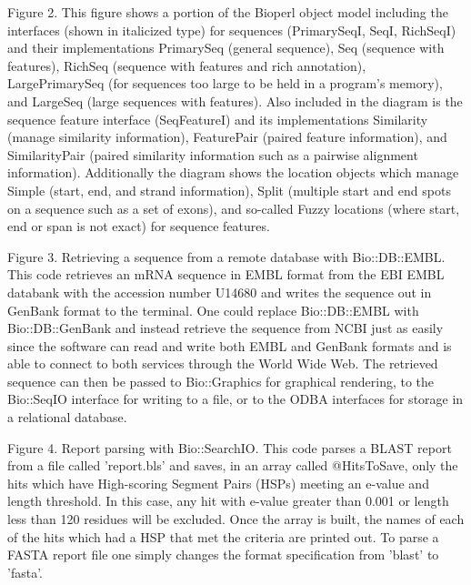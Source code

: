 \documentclass[12pt]{article}
\begin{document}
\newpage


Figure 2. This figure shows a portion of the Bioperl object model
including the interfaces (shown in italicized type) for sequences
(PrimarySeqI, SeqI, RichSeqI) and their implementations PrimarySeq
(general sequence), Seq (sequence with features), RichSeq (sequence
with features and rich annotation), LargePrimarySeq (for sequences too
large to be held in a program's memory), and LargeSeq (large sequences
with features).  Also included in the diagram is the sequence feature
interface (SeqFeatureI) and its implementations Similarity (manage
similarity information), FeaturePair (paired feature information), and
SimilarityPair (paired similarity information such as a pairwise
alignment information).  Additionally the diagram shows the location
objects which manage Simple (start, end, and strand information),
Split (multiple start and end spots on a sequence such as a set of
exons), and so-called Fuzzy locations (where start, end or span is not
exact) for sequence features.

\newpage


Figure 3. Retrieving a sequence from a remote database with
Bio::DB::EMBL.  This code retrieves an mRNA sequence in EMBL format
from the EBI EMBL databank with the accession number U14680 and writes
the sequence out in GenBank format to the terminal.  One could replace
Bio::DB::EMBL with Bio::DB::GenBank and instead retrieve the sequence
from NCBI just as easily since the software can read and write both
EMBL and GenBank formats and is able to connect to both services
through the World Wide Web.  The retrieved sequence can then be passed
to Bio::Graphics for graphical rendering, to the Bio::SeqIO interface
for writing to a file, or to the ODBA interfaces for storage in a
relational database.

\newpage


Figure 4. Report parsing with Bio::SearchIO.  This code parses a BLAST
report from a file called 'report.bls' and saves, in an array called
@HitsToSave, only the hits which have High-scoring Segment Pairs (HSPs)
meeting an e-value and length threshold.  In this case, any hit with
e-value greater than 0.001 or length less than 120 residues will be
excluded.  Once the array is built, the names of each of the hits
which had a HSP that met the criteria are printed out.  To parse a
FASTA \cite{fasta} report file one simply changes the format
specification from 'blast' to 'fasta'.
\end{document}
